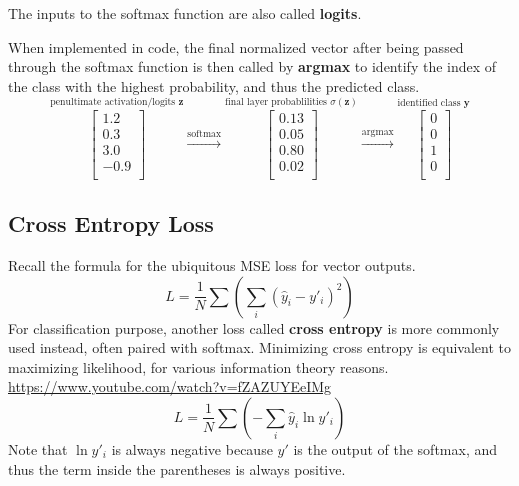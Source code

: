 \documentclass[12pt]{report}
\theoremstyle{definition}
\theoremstyle{remark}
\begin{document}
The inputs to the softmax function are also called \textbf{logits}.

When implemented in code, the final normalized vector after being passed through the softmax function is then called by \textbf{argmax} to identify the index of the class with the highest probability, and thus the predicted class.
\begin{equation}
    \stackrel{\mbox{penultimate activation/logits $\mathbf{z}$}}{\begin{bmatrix}
        1.2 \\
        0.3 \\
        3.0 \\
        -0.9 \\
    \end{bmatrix}}
    \xrightarrow{\text{softmax}}
    \stackrel{\mbox{final layer probablilities $\sigma({\mathbf{z}})$}}{\begin{bmatrix}
        0.13 \\
        0.05 \\
        0.80 \\
        0.02 \\
    \end{bmatrix}}
    \xrightarrow{\text{argmax}}
    \stackrel{\mbox{identified class $\mathbf{y}$}}{\begin{bmatrix}
        0 \\
        0 \\
        1 \\
        0 \\
    \end{bmatrix}}
\end{equation}

\subsection{Cross Entropy Loss}

Recall the formula for the ubiquitous MSE loss for vector outputs.
\begin{equation}
L = \frac{1}{N}\sum \left(\sum_i (\hat{y}_i-y'_i)^2\right)
\end{equation}
For classification purpose, another loss called \textbf{cross entropy} is more commonly used instead, often paired with softmax. Minimizing cross entropy is equivalent to maximizing likelihood, for various information theory reasons. \url{https://www.youtube.com/watch?v=fZAZUYEeIMg}
\begin{equation}
L = \frac{1}{N}\sum \left(-\sum_i \hat{y}_i \ln y'_i\right)
\end{equation}
Note that $\ln y'_i$ is always negative because $y'$ is the output of the softmax, and thus the term inside the parentheses is always positive.
\end{document}
